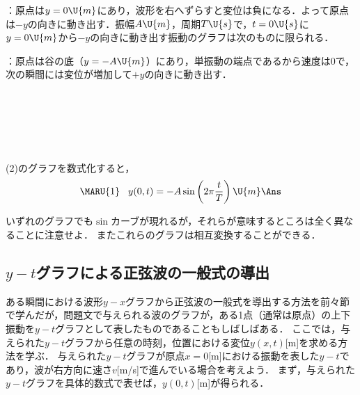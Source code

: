 \begin{reidaiunit}
\begin{kaitou}
\begin{komon}
       ：原点は$y=0\U{m}$にあり，波形を右へずらすと変位は負になる．よって原点は$-y$の向きに動き出す．振幅$A\U{m}$，周期$T\U{s}$で，$t=0\U{s}$に$y=0\U{m}$から$-y$の向きに動き出す振動のグラフは次のものに限られる．

       ：原点は谷の底（$y=-A\U{m}$）にあり，単振動の端点であるから速度は0で，次の瞬間には変位が増加して$+y$の向きに動き出す．

       \begin{center}
       \begin{minipage}{82mm}\centering{}\\[1mm]\end{minipage}\\[3mm]
       \begin{minipage}{82mm}\centering{}\\[1mm]\end{minipage}
       \end{center}
       \hspace*{\fill}\Ans
{} (2)のグラフを数式化すると，
       \[\MARU{1}\hspace{3mm}y(0,t)=-A\sin\left(2\pi\frac{t}{T}\right)\U{m}\Ans\]
\end{komon}
\end{kaitou}
\end{reidaiunit}


いずれのグラフでも$\sin$カーブが現れるが，それらが意味するところは全く異なることに注意せよ．
またこれらのグラフは相互変換することができる．

\subsection{$y-t$グラフによる正弦波の一般式の導出}
ある瞬間における波形$y-x$グラフから正弦波の一般式を導出する方法を前々節で学んだが，問題文で与えられる波のグラフが，ある1点（通常は原点）の上下振動を$y-t$グラフとして表したものであることもしばしばある．
ここでは，与えられた$y-t$グラフから任意の時刻，位置における変位$y(x,t)$[m]を求める方法を学ぶ．
与えられた$y-t$グラフが原点$x=0$[m]における振動を表した$y-t$であり，波が右方向に速さ$v$[m/s]で進んでいる場合を考えよう．
まず，与えられた$y-t$グラフを具体的数式で表せば，$y(0,t)$[m]が得られる．

